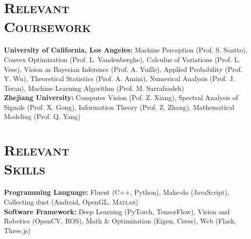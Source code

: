 \documentclass[margin, line, 10pt]{res} %
\begin{document}
\begin{resume}


\section{\textsc{Relevant\\Coursework}}
\textbf{University of California, Los Angeles:} Machine Perception (Prof. S. Soatto), Convex Optimization (Prof. L. Vandenberghe), Calculus of Variations (Prof. L. Vese), Vision as Bayesian Inference (Prof. A. Yuille), Applied Probability (Prof. Y. Wu), Theoretical Statistics (Prof. A. Amini), Numerical Analysis (Prof. J. Teran), Machine Learning Algorithm (Prof. M. Sarrafzadeh)\\
\textbf{Zhejiang University:} Computer Vision (Pof. Z. Xiang), Spectral Analysis of Signals (Prof. X. Gong), Information Theory (Prof. Z. Zhang), Mathematical Modeling (Prof. Q. Yang)

\section{\textsc{Relevant\\Skills}}
\textbf{Programming Language:} Fluent (C++, Python), Make-do (JavaScript), Collecting dust (Android, OpenGL, \textsc{Matlab})\\
\textbf{Software Framework:} Deep Learning (PyTorch, TensorFlow), Vision and Robotics (OpenCV, ROS), Math \& Optimization (Eigen, Ceres), Web (Flask, Three.js)


\end{resume}
\end{document}
